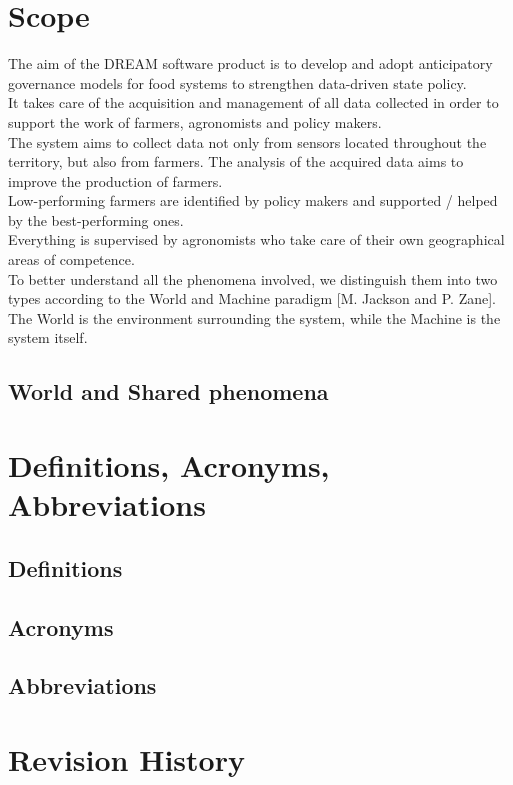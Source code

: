 \documentclass[a4paper,11pt]{report}
\begin{document}
\section{Scope}
The aim of the DREAM software product is to develop and adopt anticipatory governance models for food systems to strengthen data-driven state policy. \\
It takes care of the acquisition and management of all data collected in order to support the work of farmers, agronomists and policy makers.\\
The system aims to collect data not only from sensors located throughout the territory, but also from farmers. The analysis of the acquired data aims to improve the production of farmers.\\ Low-performing farmers are identified by policy makers and supported / helped by the best-performing ones.\\
Everything is supervised by agronomists who take care of their own geographical areas of competence.\\

To better understand all the phenomena involved, we distinguish them into two types according to the World and Machine paradigm [M. Jackson and P. Zane]. The World is the environment surrounding the system, while the Machine is the system itself.

\subsection{World and Shared phenomena}

\section{Definitions, Acronyms, Abbreviations}
\subsection{Definitions}
\subsection{Acronyms}
\subsection{Abbreviations}

\section{Revision History}
\end{document}
